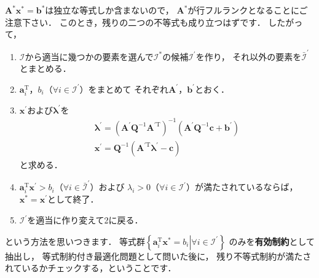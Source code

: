 ﻿\documentclass{jsarticle}
\begin{document}
$\boldsymbol{A}^{*}\boldsymbol{x}^{*}=\boldsymbol{b}^{*}$は独立な等式しか含まないので，
$\boldsymbol{A}^{*}$が行フルランクとなることにご注意下さい．
このとき，残りの二つの不等式も成り立つはずです．
したがって，
\begin{screen}
\begin{enumerate}
\item{$\mathcal{I}$から適当に幾つかの要素を選んで$\mathcal{I}^{*}$の候補$\mathcal{I}^{\prime}$を作り，
それ以外の要素を$\bar{\mathcal{I}}^{\prime}$とまとめる．}
\item{$\boldsymbol{a}_{i}^{\mathrm{T}}$，$b_{i}$（$\forall i\in\mathcal{I}^{\prime}$）をまとめて
それぞれ$\boldsymbol{A}^{\prime}$，$\boldsymbol{b}^{\prime}$とおく．}
\item{
$\boldsymbol{x}^{\prime}$および$\boldsymbol{\lambda}^{\prime}$を
\begin{align*}
\boldsymbol{\lambda}^{\prime}
=
\left(\boldsymbol{A}^{\prime}\boldsymbol{Q}^{-1}\boldsymbol{A}^{\prime\mathrm{T}}\right)^{-1}
\left(
\boldsymbol{A}^{\prime}\boldsymbol{Q}^{-1}\boldsymbol{c}
+
\boldsymbol{b}^{\prime}
\right)
\\
\boldsymbol{x}^{\prime}
=
\boldsymbol{Q}^{-1}
\left(
\boldsymbol{A}^{\prime\mathrm{T}}\boldsymbol{\lambda}^{\prime}-\boldsymbol{c}
\right)
\end{align*}
と求める．}
\item{
$\boldsymbol{a}_{i}^{\mathrm{T}}\boldsymbol{x}^{\prime}>b_{i}$（$\forall i\in\bar{\mathcal{I}}^{\prime}$）および
$\lambda_{i}>0$（$\forall i\in\mathcal{I}^{\prime}$）が満たされているならば，
$\boldsymbol{x}^{*}=\boldsymbol{x}^{\prime}$として終了．}
\item{$\mathcal{I}^{\prime}$を適当に作り変えて2に戻る．}
\end{enumerate}
\end{screen}
という方法を思いつきます．
等式群$\left\{\boldsymbol{a}_{i}^{\mathrm{T}}\boldsymbol{x}^{*}=b_{i}\left|\forall i\in\mathcal{I}^{\prime}\right.\right\}$
のみを{\bf 有効制約}として抽出し，
等式制約付き最適化問題として問いた後に，
残り不等式制約が満たされているかチェックする，ということです．
\end{document}
